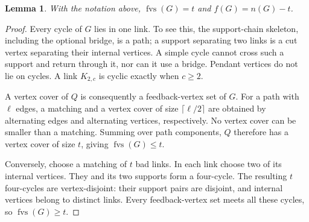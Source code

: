 \documentclass[11pt,a4paper]{article}
\newtheorem{lemma}[theorem]{Lemma}
\theoremstyle{definition}\newtheorem{definition}[theorem]{Definition}
\theoremstyle{remark}\newtheorem{remark}[theorem]{Remark}
\begin{document}
\begin{lemma}\label{late:geodesic:lem:fvs}
With the notation above, $\operatorname{fvs}(G)=t$ and $f(G)=n(G)-t$.
\end{lemma}
\begin{proof}
Every cycle of $G$ lies in one link. To see this, the support-chain
skeleton, including the optional bridge, is a path; a support separating
two links is a cut vertex separating their internal vertices. A simple
cycle cannot cross such a support and return through it, nor can it use
a bridge. Pendant vertices do not lie on cycles. A link $K_{2,c}$ is
cyclic exactly when $c\ge2$.

A vertex cover of $Q$ is consequently a feedback-vertex set of $G$.
For a path with $\ell$ edges, a matching and a vertex cover of size
$\lceil\ell/2\rceil$ are obtained by alternating edges and alternating
vertices, respectively. No vertex cover can be smaller than a matching.
Summing over path components, $Q$ therefore has a vertex cover of size
$t$, giving $\operatorname{fvs}(G)\le t$.

Conversely, choose a matching of $t$ bad links. In each link choose two
of its internal vertices. They and its two supports form a four-cycle.
The resulting $t$ four-cycles are vertex-disjoint: their support pairs
are disjoint, and internal vertices belong to distinct links. Every
feedback-vertex set meets all these cycles, so $\operatorname{fvs}(G)\ge t$.
\end{proof}
\end{document}
